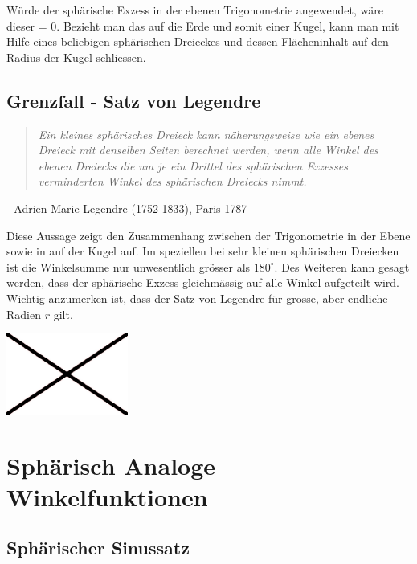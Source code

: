 \begin{refsection}
Würde der sphärische Exzess in der ebenen Trigonometrie angewendet, wäre dieser = 0. 
Bezieht man das auf die Erde und somit einer Kugel, kann man mit Hilfe eines beliebigen sphärischen Dreieckes und dessen Flächeninhalt auf den Radius der Kugel schliessen.

\subsection{Grenzfall - Satz von Legendre}

\begin{quote} \textit{Ein kleines sphärisches Dreieck kann näherungsweise 
wie ein ebenes Dreieck mit denselben Seiten berechnet 
werden, wenn alle Winkel des ebenen Dreiecks die um 
je ein Drittel des sphärischen Exzesses verminderten 
Winkel des sphärischen Dreiecks nimmt.} \end{quote}
\begin{flushright} - Adrien-Marie Legendre (1752-1833), Paris 1787
\end{flushright}

Diese Aussage zeigt den Zusammenhang zwischen der 
Trigonometrie in der Ebene sowie in auf der Kugel
auf. Im speziellen bei sehr kleinen sphärischen 
Dreiecken ist die Winkelsumme nur unwesentlich 
grösser als $180^{\circ}$. Des Weiteren kann gesagt werden,
dass der sphärische Exzess gleichmässig auf alle
Winkel aufgeteilt wird.
Wichtig anzumerken ist, dass der Satz von Legendre 
für grosse, aber endliche Radien $r$ gilt.

\begin{center}
        \includegraphics[width=0.3\textwidth]{kugel/Beispielbild.jpg}
\end{center}


\section{Sphärisch Analoge Winkelfunktionen}

\subsection{Sphärischer Sinussatz}


\end{refsection}
